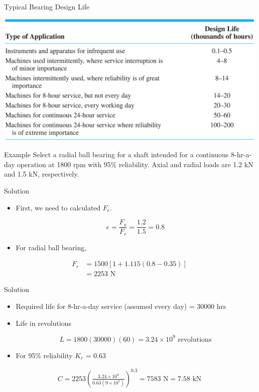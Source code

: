 \documentclass[10pt, svgnames]{beamer}
\begin{document}
\begin{frame}[label={sec:org429df62}]{Typical Bearing Design Life}
\begin{center}
\includegraphics[width=\textwidth]{./pictures/designed-bearing-life.png}
\end{center}
\end{frame}

\begin{frame}[label={sec:org1c7bacc}]{Example}
Select a radial ball bearing for a shaft intended for a continuous 8-hr-a-day operation at 1800 rpm with 95\% reliability. Axial and radial loads are 1.2 kN and 1.5 kN, respectively.
\end{frame}

\begin{frame}[label={sec:orgdee2892}]{Solution}
\begin{itemize}
\item First, we need to calculated \(F_e\).

$$e = \frac{F_a}{F_r} = \frac{1.2}{1.5} = 0.8$$

\item For radial ball bearing,
\end{itemize}

\begin{align*}
    F_e &= 1500 \left[ 1 + 1.115(0.8 - 0.35) \right] \\
        &= 2253 \text{ N}
\end{align*}
\end{frame}

\begin{frame}[label={sec:org80da324}]{Solution}
\begin{itemize}
\item Required life for 8-hr-a-day service (assumed every day) = 30000 hrs

\item Life in revolutions

$$L = 1800(30000)(60) = 3.24 \times 10^9 \text{ revolutions}$$

\item For 95\% reliability \(K_r\) = 0.63
\end{itemize}

\begin{align*}
    C = 2253 \left( \frac{3.24 \times 10^9}{0.63 (9 \times 10^7)} \right)^{0.3} = 7583 \text{ N} = 7.58 \text{ kN}
\end{align*}
\end{frame}
\end{document}
